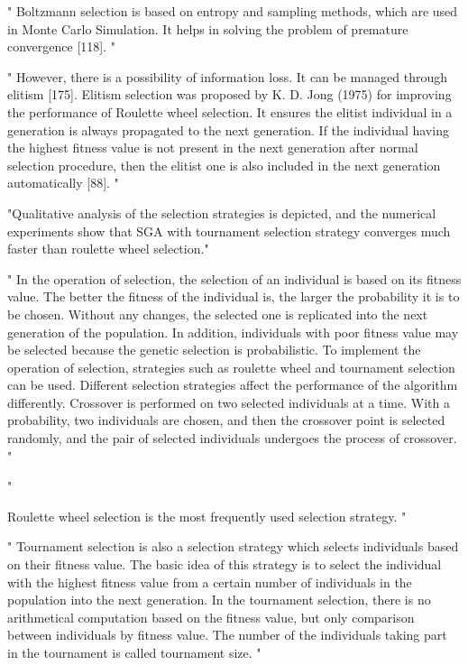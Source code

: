 "
Boltzmann selection is based on entropy and sampling methods, which are used in Monte Carlo Simulation. It helps in solving the problem of premature convergence [118].
"\cite{katoch_review_2021}


"
However, there is a possibility of information loss. It can be managed through elitism [175]. Elitism selection was proposed by K. D. Jong (1975) for improving the performance of Roulette wheel selection. It ensures the elitist individual in a generation is always propagated to the next generation. If the individual having the highest fitness value is not present in the next generation after normal selection procedure, then the elitist one is also included in the next generation automatically [88].
"\cite{katoch_review_2021}


"Qualitative analysis of the selection strategies is depicted, and the numerical experiments show that SGA with tournament selection strategy converges much faster than roulette wheel selection."
\cite{jinghui_zhong_comparison_2005}

"
In the operation of selection, the selection of an individual is based on its fitness value. The better the fitness of the individual is, the larger the probability it is to be chosen. Without any changes, the selected one is replicated into the next generation of the population. In addition, individuals with poor fitness value may be selected because the genetic selection is probabilistic. To implement the operation of selection, strategies such as roulette wheel and tournament selection can be used. Different selection strategies affect the performance of the algorithm differently. Crossover is performed on two selected individuals at a time. With a probability, two individuals are chosen, and then the crossover point is selected randomly, and the pair of selected individuals undergoes the process of crossover.
"\cite{jinghui_zhong_comparison_2005}

"

Roulette wheel selection is the most frequently used selection strategy.
"\cite{jinghui_zhong_comparison_2005}


"
Tournament selection is also a selection strategy which selects individuals based on their fitness value. The basic idea of this strategy is to select the individual with the highest fitness value from a certain number of individuals in the population into the next generation. In the tournament selection, there is no arithmetical computation based on the fitness value, but only comparison between individuals by fitness value. The number of the individuals taking part in the tournament is called tournament size.
"\cite{jinghui_zhong_comparison_2005}

